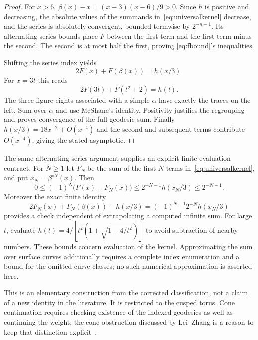 \begin{proof}
For $x>6$,
$\beta(x)-x=(x-3)(x-6)/9>0$. Since $h$ is positive and decreasing,
the absolute values of the summands in~\eqref{eq:universalkernel} decrease,
and the series is absolutely convergent, bounded termwise by $2^{-n-1}$.
Its alternating-series bounds place $F$ between the first term and the
first term minus the second. The second is at most half the first, proving
\eqref{eq:fbound}'s inequalities.

Shifting the series index yields
\[
 2F(x)+F(\beta(x))=h(x/3).
\]
For $x=3t$ this reads
\begin{equation}
 2F(3t)+F(t^2+2)=h(t).
 \label{eq:kernelrelation}
\end{equation}
The three figure-eights associated with a simple $\alpha$ have exactly
the traces on the left. Sum over $\alpha$ and use McShane's identity.
Positivity justifies the regrouping and proves convergence of the full
geodesic sum. Finally $h(x/3)=18x^{-2}+O(x^{-4})$ and the second and
subsequent terms contribute $O(x^{-4})$, giving the stated asymptotic.
\end{proof}

The same alternating-series argument supplies an explicit finite
evaluation contract. For $N\geq1$ let $F_N$ be the sum of the first $N$
terms in~\eqref{eq:universalkernel}, and put $x_N=\beta^{\circ N}(x)$.
Then
\begin{equation}
 0\leq(-1)^N\bigl(F(x)-F_N(x)\bigr)
 \leq 2^{-N-1}h(x_N/3)\leq 2^{-N-1}.
 \label{eq:figurekerneltail}
\end{equation}
Moreover the exact finite identity
\begin{equation}
 2F_N(x)+F_N(\beta(x))-h(x/3)
   =(-1)^{N-1}2^{-N}h(x_N/3)
 \label{eq:figurefiniteidentity}
\end{equation}
provides a check independent of extrapolating a computed infinite sum.
For large $t$, evaluate
$h(t)=4/[t^2(1+\sqrt{1-4/t^2})]$ to avoid subtraction of nearby numbers.
These bounds concern evaluation of the kernel. Approximating the sum over
surface curves additionally requires a complete index enumeration and a
bound for the omitted curve classes; no such numerical approximation is
asserted here.

This is an elementary construction from the corrected classification,
not a claim of a new identity in the literature. It is restricted to the
cusped torus. Cone continuation requires checking existence of the indexed
geodesics as well as continuing the weight; the cone obstruction discussed
by Lei--Zhang is a reason to keep that distinction explicit~\cite{LeiZhang}.

